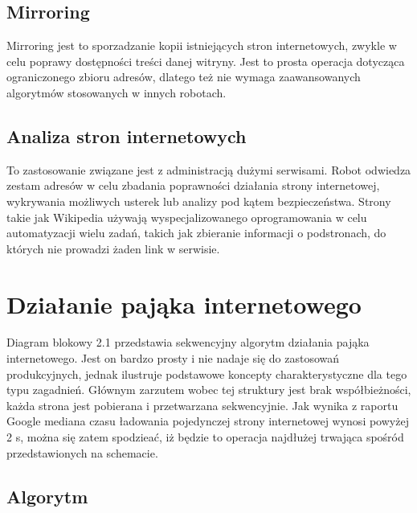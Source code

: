 \subsection{Mirroring}
\label{subsec:mirroring}
Mirroring jest to sporzadzanie kopii istniejących stron internetowych, zwykle w celu poprawy dostępności treści danej witryny. Jest to prosta operacja dotycząca ograniczonego zbioru adresów, dlatego też nie wymaga zaawansowanych algorytmów stosowanych w innych robotach.

\subsection{Analiza stron internetowych}
\label{subsec:analizaStr}
To zastosowanie związane jest z administracją dużymi serwisami. Robot odwiedza zestam adresów w celu zbadania poprawności działania strony internetowej, wykrywania możliwych usterek lub analizy pod kątem bezpieczeństwa. Strony takie jak Wikipedia używają wyspecjalizowanego oprogramowania w celu automatyzacji wielu zadań, takich jak zbieranie informacji o podstronach, do których nie prowadzi żaden link w serwisie\cite{webCrawling}.


\section{Działanie pająka internetowego}
\label{sec:dzialaniePajaka}

Diagram blokowy 2.1 przedstawia sekwencyjny algorytm działania pająka internetowego. Jest on bardzo prosty i nie nadaje się do zastosowań produkcyjnych, jednak ilustruje podstawowe koncepty charakterystyczne dla tego typu zagadnień. Głównym zarzutem wobec tej struktury jest brak współbieżności, każda strona jest pobierana i przetwarzana sekwencyjnie. Jak wynika z raportu Google mediana czasu ładowania pojedynczej strony internetowej wynosi powyżej 2 s\cite{loadTime}, można się zatem spodzieać, iż będzie to operacja najdłużej trwająca spośród przedstawionych na schemacie.



\subsection{Algorytm}
\label{subsec:algorytmPajaka}

